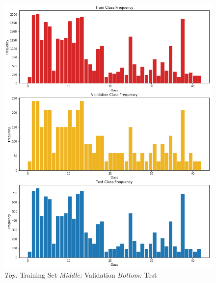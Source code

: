 \documentclass[12pt,twoside]{article}
\begin{document}
\begin{figure}[H]
	\begin{center}
		\includegraphics[width = 1.0\hsize]{./figures/Distribution.png} 
		\caption{\emph{Top: }Training Set \emph{Middle: }Validation \emph{Bottom: }Test} %
		\label{fig:image distribution} %
	\end{center}
\end{figure}

\newpage
\end{document}
